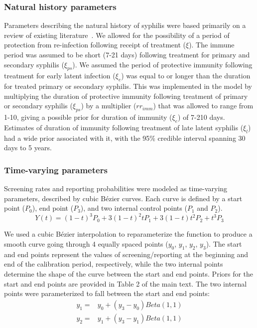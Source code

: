 \documentclass[a4paper]{article}
\begin{document}
\subsubsection{Natural history parameters}
\label{subsec:nat hist}
Parameters describing the natural history of syphilis were based primarily on a review of existing literature~\autocite{Garnett1997}. We allowed for the possibility of a period of protection from re-infection following receipt of treatment ($\xi$). The immune period was assumed to be short (7-21 days) following treatment for primary and secondary syphilis ($\xi_{ps}$). We assumed the period of protective immunity following treatment for early latent infection ($\xi_e$) was equal to or longer than the duration for treated primary or secondary syphilis. This was implemented in the model by multiplying the duration of protective immunity following treatment of primary or secondary syphilis ($\xi_{ps}$) by a multiplier ($rr_{imm}$) that was allowed to range from 1-10, giving a possible prior for duration of immunity ($\xi_e$) of 7-210 days. Estimates of duration of immunity following treatment of late latent syphilis ($\xi_l$) had a wide prior associated with it, with the 95\% credible interval spanning 30 days to 5 years. 
\subsubsection{Time-varying parameters}
\label{subsubsec:bezier}
Screening rates and reporting probabilities were modeled as time-varying parameters, described by cubic B\'ezier curves. Each curve is defined by a start point ($P_0$), end point ($P_3$), and two internal control points ($P_1$ and $P_2$). 
\[Y(t) = (1-t)^3 P_0 + 3(1-t)^2 t P_1 + 3(1-t) t^2 P_2 + t^3 P_3\]

We used a cubic B\'ezier interpolation to reparameterize the function to produce a smooth curve going through 4 equally spaced points ($y_0$, $y_1$, $y_2$, $y_3$). The start and end points represent the values of screening/reporting at the beginning and end of the calibration period, respectively, while the two internal points determine the shape of the curve between the start and end points. Priors for the start and end points are provided in Table 2 of the main text. The two internal points were parameterized to fall between the start and end points:
\begin{equation*}\label{4}
\begin{aligned}
y_1 = {} & y_0 + (y_3 - y_0) Beta(1,1) \\
y_2 = {} & y_1 + (y_3 - y_1) Beta(1,1) \\
\end{aligned}
\end{equation*}
\end{document}
